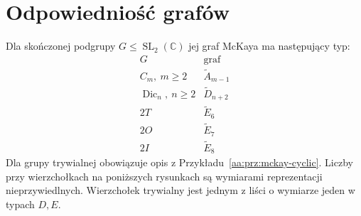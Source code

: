\section{Odpowiedniość grafów}

\begin{twierdzenie}
\label{aa:tw:mckay-ade}
Dla skończonej podgrupy $G\le\operatorname{SL}_2(\mathbb C)$
jej graf McKaya ma następujący typ:
\[
\begin{array}{c|c}
G&\text{graf}\\ \hline
C_m,\ m\ge2&\widetilde A_{m-1}\\
\operatorname{Dic}_n,\ n\ge2&\widetilde D_{n+2}\\
2T&\widetilde E_6\\
2O&\widetilde E_7\\
2I&\widetilde E_8
\end{array}
\]
Dla grupy trywialnej obowiązuje opis z
Przykładu~\ref{aa:prz:mckay-cyclic}.
Liczby przy wierzchołkach na poniższych rysunkach
są wymiarami reprezentacji nieprzywiedlnych.
Wierzchołek trywialny jest jednym z liści o wymiarze
jeden w typach $D,E$.
\end{twierdzenie}
